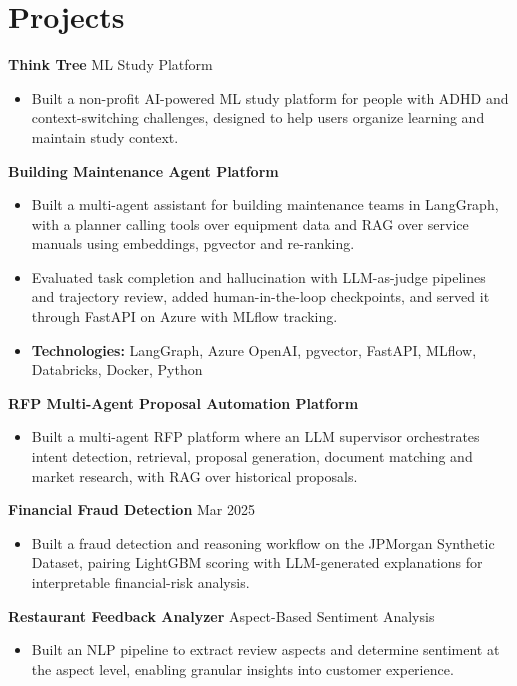 \documentclass[10pt,a4paper]{article}
\begin{document}
\section{Projects}
\textbf{Think Tree} \textbar{} ML Study Platform\par
\begin{itemize}
  \item Built a non-profit AI-powered ML study platform for people with ADHD and context-switching challenges, designed to help users organize learning and maintain study context.
\end{itemize}
\textbf{Building Maintenance Agent Platform}\par
\begin{itemize}
  \item Built a multi-agent assistant for building maintenance teams in LangGraph, with a planner calling tools over equipment data and RAG over service manuals using embeddings, pgvector and re-ranking.
  \item Evaluated task completion and hallucination with LLM-as-judge pipelines and trajectory review, added human-in-the-loop checkpoints, and served it through FastAPI on Azure with MLflow tracking.
  \item \textbf{Technologies:} LangGraph, Azure OpenAI, pgvector, FastAPI, MLflow, Databricks, Docker, Python
\end{itemize}
\textbf{RFP Multi-Agent Proposal Automation Platform}\par
\begin{itemize}
  \item Built a multi-agent RFP platform where an LLM supervisor orchestrates intent detection, retrieval, proposal generation, document matching and market research, with RAG over historical proposals.
\end{itemize}
\textbf{Financial Fraud Detection} \textbar{} Mar 2025\par
\begin{itemize}
  \item Built a fraud detection and reasoning workflow on the JPMorgan Synthetic Dataset, pairing LightGBM scoring with LLM-generated explanations for interpretable financial-risk analysis.
\end{itemize}
\textbf{Restaurant Feedback Analyzer} \textbar{} Aspect-Based Sentiment Analysis\par
\begin{itemize}
  \item Built an NLP pipeline to extract review aspects and determine sentiment at the aspect level, enabling granular insights into customer experience.
\end{itemize}
\end{document}
